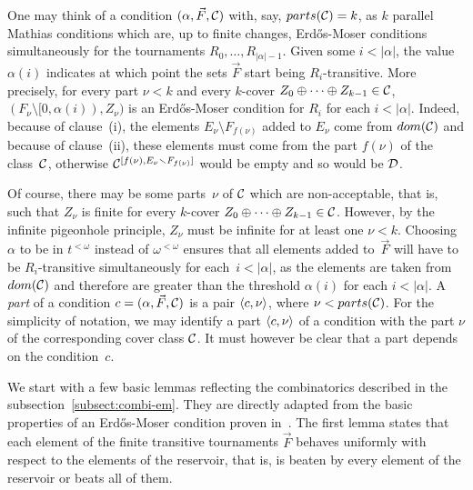 One may think of a condition $(\alpha, \vec{F}, \mathcal{C})$ with, say, $parts(\mathcal{C}) = k$,
as $k$ parallel Mathias conditions which are,
up to finite changes, Erd\H{o}s-Moser conditions simultaneously for the tournaments $R_0, \dots, R_{|\alpha|-1}$.
Given some $i < |\alpha|$, the value $\alpha(i)$ indicates at which point the sets $\vec{F}$
start being $R_i$-transitive.
More precisely, for every part $\nu < k$ and every $k$-cover $Z_0 \oplus \dots \oplus Z_{k-1} \in \mathcal{C}$,
$(F_\nu \setminus [0, \alpha(i)), Z_\nu)$ is an Erd\H{o}s-Moser condition for $R_i$ for each $i < |\alpha|$.
Indeed, because of clause~(i), the elements $E_\nu \setminus F_{f(\nu)}$ added to $E_\nu$ come from $dom(\mathcal{C})$
and because of clause~(ii), these elements must come from the part $f(\nu)$ of the class~$\mathcal{C}$,
otherwise $\mathcal{C}^{[f(\nu), E_\nu \smallsetminus F_{f(\nu)}]}$ would be empty and so would be $\mathcal{D}$.

Of course, there may be some parts~$\nu$ of $\mathcal{C}$ which are non-acceptable, that is, such that $Z_\nu$ is finite
for every $k$-cover $Z_0 \oplus \dots \oplus Z_{k-1} \in \mathcal{C}$. However, by the infinite pigeonhole principle, 
$Z_\nu$ must be infinite for at least one $\nu < k$.
Choosing $\alpha$ to be in $t^{<\omega}$ instead of $\omega^{<\omega}$
ensures that all elements added to~$\vec{F}$ will have to be $R_i$-transitive
simultaneously for each~$i < |\alpha|$, as the elements are taken from $dom(\mathcal{C})$
and therefore are greater than the threshold $\alpha(i)$ for each $i < |\alpha|$.
A \emph{part} of a condition $c = (\alpha, \vec{F}, \mathcal{C})$ is a pair $\left\langle c, \nu \right\rangle$,
where $\nu < parts(\mathcal{C})$. For the simplicity of notation, we may identify a part $\left\langle c, \nu \right\rangle$
of a condition with the part $\nu$ of the corresponding cover class $\mathcal{C}$. It must however be clear
that a part depends on the condition~$c$.

We start with a few basic lemmas reflecting the combinatorics described in 
the subsection~\ref{subsect:combi-em}.
They are directly adapted from the basic properties of an Erd\H{o}s-Moser condition
proven in~\cite{Patey2015Degrees}.
The first lemma states that each element of the finite transitive tournaments $\vec{F}$ behaves
uniformly with respect to the elements of the reservoir, that is, is beaten by every element
of the reservoir or beats all of them.

